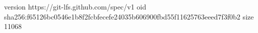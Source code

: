 version https://git-lfs.github.com/spec/v1
oid sha256:f65126bc0546e1b8f2fcbfecefe24035b606900fbd55f11625763eeed7f3f0b2
size 11068
